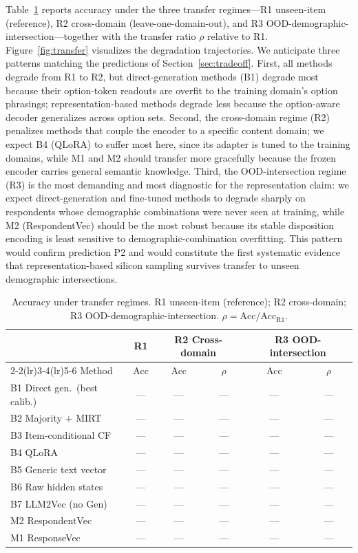 Table~\ref{tab:transfer} reports accuracy under the three transfer regimes---R1 unseen-item (reference), R2 cross-domain (leave-one-domain-out), and R3 OOD-demographic-intersection---together with the transfer ratio $\rho$ relative to R1. Figure~\ref{fig:transfer} visualizes the degradation trajectories. We anticipate three patterns matching the predictions of Section~\ref{sec:tradeoff}. First, all methods degrade from R1 to R2, but direct-generation methods (B1) degrade most because their option-token readouts are overfit to the training domain's option phrasings; representation-based methods degrade less because the option-aware decoder generalizes across option sets. Second, the cross-domain regime (R2) penalizes methods that couple the encoder to a specific content domain; we expect B4 (QLoRA) to suffer most here, since its adapter is tuned to the training domains, while M1 and M2 should transfer more gracefully because the frozen encoder carries general semantic knowledge. Third, the OOD-intersection regime (R3) is the most demanding and most diagnostic for the representation claim: we expect direct-generation and fine-tuned methods to degrade sharply on respondents whose demographic combinations were never seen at training, while M2 (RespondentVec) should be the most robust because its stable disposition encoding is least sensitive to demographic-combination overfitting. This pattern would confirm prediction P2 and would constitute the first systematic evidence that representation-based silicon sampling survives transfer to unseen demographic intersections.

\begin{table}[tb]
\centering
\small
\caption{Accuracy under transfer regimes. R1 unseen-item (reference); R2 cross-domain; R3 OOD-demographic-intersection. $\rho = \text{Acc}/\text{Acc}_{\text{R1}}$.}
\label{tab:transfer}
\begin{tabular}{lccccc}
\toprule
 & R1 & \multicolumn{2}{c}{R2 Cross-domain} & \multicolumn{2}{c}{R3 OOD-intersection} \\
\cmidrule(lr){2-2}\cmidrule(lr){3-4}\cmidrule(lr){5-6}
Method & Acc & Acc & $\rho$ & Acc & $\rho$ \\
\midrule
B1 Direct gen.\ (best calib.) & --- & --- & --- & --- & --- \\
B2 Majority + MIRT            & --- & --- & --- & --- & --- \\
B3 Item-conditional CF        & --- & --- & --- & --- & --- \\
B4 QLoRA                      & --- & --- & --- & --- & --- \\
B5 Generic text vector        & --- & --- & --- & --- & --- \\
B6 Raw hidden states          & --- & --- & --- & --- & --- \\
B7 LLM2Vec (no Gen)           & --- & --- & --- & --- & --- \\
\midrule
M2 RespondentVec              & --- & --- & --- & --- & --- \\
M1 ResponseVec                & --- & --- & --- & --- & --- \\
\bottomrule
\end{tabular}
\end{table}

